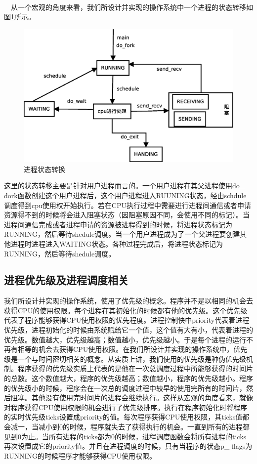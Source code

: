\documentclass[UTF8,nofonts,cs4size]{ctexrep}
\begin{document}
\paragraph{}
\indent \ \ 
从一个宏观的角度来看，我们所设计并实现的操作系统中一个进程的状态转移如图\ref{procstatus}所示。

\begin{figure}[htp]
\centering
\includegraphics[scale=0.4]{procstatus.eps}
\caption{进程状态转换}
\label{procstatus}
\end{figure}

这里的状态转移主要是针对用户进程而言的。一个用户进程在其父进程使用do\_ dork函数创建这个用户进程后，这个用户进程进入RUUNING状态，经由schdule调度得到cpu使用权开始执行。若在CPU执行过程中需要进行进程间通信或者申请资源得不到的时候将会进入阻塞状态（因阻塞原因不同，会使用不同的标记）。当进程间通信完成或者进程申请的资源被进程得到的时候，将进程状态标记为RUNNING，然后等待shedule调度。当一个用户进程成为了一个父进程要创建其他进程时进程进入WAITING状态。各种过程完成后，将进程状态标记为RUNNING，然后等待shedule调度。
\subsection{进程优先级及进程调度相关}
我们所设计并实现的操作系统，使用了优先级的概念。程序并不是以相同的机会去获得CPU的使用权限。每个进程在其初始化的时候都有他的优先级。这个优先级代表了程序能够获得CPU使用权限的优先程度。进程控制快中priority代表着进程优先级，进程初始化的时候由系统赋给它一个值，这个值有大有小，代表着进程的优先级。数值越大，优先级越高；数值越小，优先级越小。于是每个进程的运行不再有相等的机会去获得CPU使用权限。在我们所设计并实现的操作系统中，优先级是一个与时间密切相关的概念。从实质上讲，我们使用的优先级是种伪优先级机制。程序获得的优先级实质上代表的是他在一次总调度过程中所能够获得的时间片的总数。这个数值越大，程序的优先级越高；数值越小，程序的优先级越小。程序的优先级小的时候，程序会在一次总的调度过程中较早的使用完所有的时间片，然后阻塞。其他没有使用完时间片的进程会继续执行。这样从宏观的角度看来，就像对程序获得CPU使用权限的机会进行了优先级排序。执行在程序初始化时将程序的实时优先级ticks设置成priority的值。每次程序获得CPU使用权限，其ticks值都会减一，当减小到0的时候，程序就失去了获得执行的机会。一直到所有的进程都见到0为止。当所有进程的ticks都为0的时候，进程调度函数会将所有进程的ticks再次设置成它的priority值。并且在进程调度的时候，只有当程序的状态p\_ flags为RUNNING的时候程序才能够获得CPU使用权限。
\end{document}
